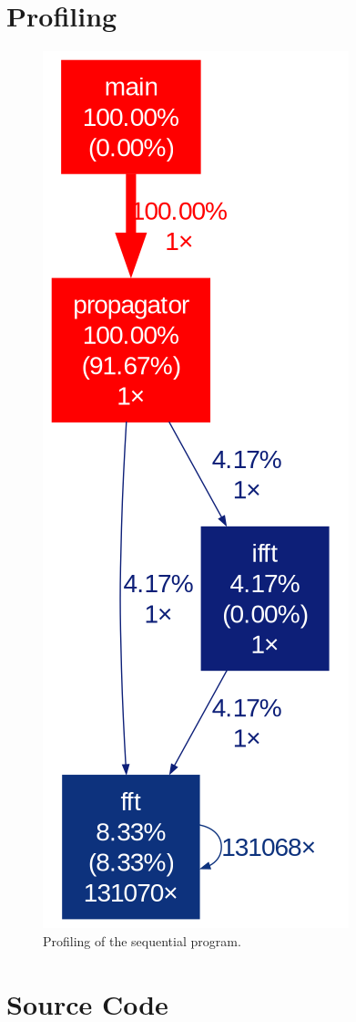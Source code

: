 \documentclass{article}
\begin{document}
\appendix
\newpage
\section{Profiling}
\label{sec:Profiling}
\begin{figure}[h]
    \includegraphics[height=0.6\textheight]{figures/gprof_seq.png}
    \centering
    \caption*{Profiling of the sequential program.}
\end{figure}
\FloatBarrier
\section{Source Code}
\label{sec:source}

\end{document}
